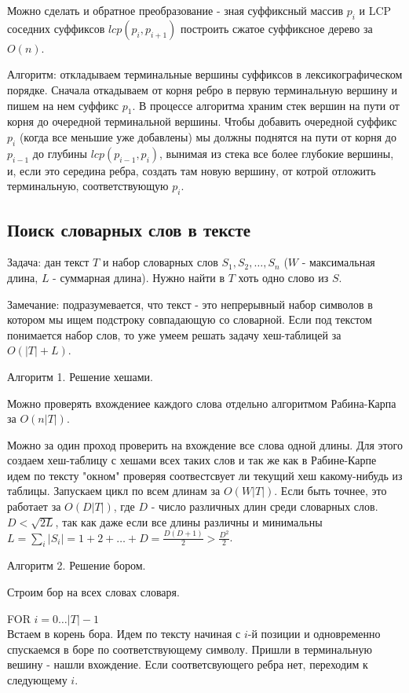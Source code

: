 Можно сделать и обратное преобразование - зная суффиксный массив $p_i$ и LCP соседних суффиксов $lcp(p_i, p_{i + 1})$ построить сжатое суффиксное дерево за $O(n)$.

Алгоритм: откладываем терминальные вершины суффиксов в лексикографическом порядке. Сначала откадываем от корня ребро в первую терминальную вершину и пишем на нем суффикс $p_1$. В процессе алгоритма храним стек вершин на пути от корня до очередной терминальной вершины. Чтобы добавить очередной суффикс $p_i$ (когда все меньшие уже добавлены) мы должны поднятся на пути от корня до $p_{i - 1}$ до глубины $lcp(p_{i - 1}, p_i)$, вынимая из стека все более глубокие вершины, и, если это середина ребра, создать там новую вершину, от котрой отложить терминальную, соответствующую $p_i$.

\subsection{Поиск словарных слов в тексте}

Задача: дан текст $T$ и набор словарных слов $S_1, S_2, \dots, S_n$ ($W$ - максимальная длина, $L$ - суммарная длина). Нужно найти в $T$ хоть одно слово из $S$.

Замечание: подразумевается, что текст - это непрерывный набор символов в котором мы ищем подстроку совпадающую со словарной. Если под текстом понимается набор слов, то уже умеем решать задачу хеш-таблицей за $O(|T| + L)$.

Алгоритм 1. Решение хешами.

Можно проверять вхождениее каждого слова отдельно алгоритмом Рабина-Карпа за $O(n |T|)$.

Можно за один проход проверить на вхождение все слова одной длины. Для этого создаем хеш-таблицу с хешами всех таких слов и так же как в Рабине-Карпе идем по тексту "окном" проверяя соотвестсвует ли текущий хеш какому-нибудь из таблицы. Запускаем цикл по всем длинам за $O(W |T|)$. Если быть точнее, это работает за $O(D |T|)$, где $D$ - число различных длин среди словарных слов. $D < \sqrt{2 L}$, так как даже если все длины различны и минимальны $L = \sum_i |S_i| = 1 + 2 + \dots + D = \frac{D (D + 1)}{2} > \frac{D^2}{2}$.

Алгоритм 2. Решение бором.

Строим бор на всех словах словаря.

FOR $i = 0 \dots |T| - 1$\\
Встаем в корень бора. Идем по тексту начиная с $i$-й позиции и одновременно спускаемся в боре по соответствующему символу. Пришли в терминальную вешину - нашли вхождение. Если соответсвующего ребра нет, переходим к следующему $i$.


